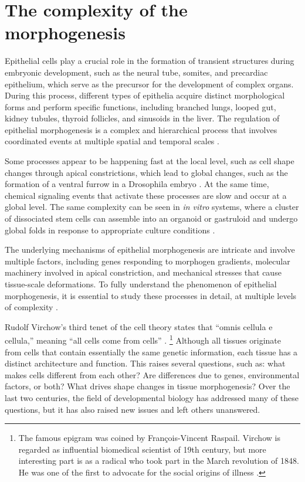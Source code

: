 

\hypertarget{the-complexity-of-the-morphogenesis}{%
\section{The complexity of the
morphogenesis}\label{the-complexity-of-the-morphogenesis}}

Epithelial cells play a crucial role in the formation of transient structures during embryonic development, such as the neural tube, somites, and precardiac epithelium, which serve as the precursor for the development of complex organs. During this process, different types of epithelia acquire distinct morphological forms and perform specific functions, including branched lungs, looped gut, kidney tubules, thyroid follicles, and sinusoids in the liver. The regulation of epithelial morphogenesis is a complex and hierarchical process that involves coordinated events at multiple spatial and temporal scales \cite{trepat2018}.

Some processes appear to be happening fast at the local level, such as cell shape changes through apical constrictions, which lead to global changes, such as the formation of a ventral furrow in a Drosophila embryo \cite{martin2009}. At the same time, chemical signaling events that activate these processes are slow and occur at a global level. The same complexity can be seen in\textit{ in vitro} systems, where a cluster of dissociated stem cells can assemble into an organoid or gastruloid and undergo global folds in response to appropriate culture conditions \cite{collinet2021}.

The underlying mechanisms of epithelial morphogenesis are intricate and involve multiple factors, including genes responding to morphogen gradients, molecular machinery involved in apical constriction, and mechanical stresses that cause tissue-scale deformations. To fully understand the phenomenon of epithelial morphogenesis, it is essential to study these processes in detail, at multiple levels of complexity \cite{schock2002, lecuit2011}.

Rudolf Virchow's third tenet of the cell theory states that ``omnis cellula e cellula,'' meaning ``all cells come from cells'' \cite{virchow1860}.
\footnote{The famous epigram was coined by François-Vincent Raspail. Virchow is regarded as influential biomedical scientist of 19th century, but more interesting part is as a radical who took part in the March revolution of 1848. He was one of the first to advocate for the social origins of illness \cite{wright2012, brown2006}.}
Although all tissues originate from cells that contain essentially the same genetic information, each tissue has a distinct architecture and function. This raises several questions, such as: what makes cells different from each other? Are differences due to genes, environmental factors, or both? What drives shape changes in tissue morphogenesis? Over the last two centuries, the field of developmental biology has addressed many of these questions, but it has also raised new issues and left others unanswered.

